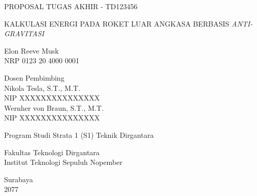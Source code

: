\begin{large}
  PROPOSAL TUGAS AKHIR - TD123456
\end{large}

\vspace{\fill}

\begin{spacing}{1.5}
  \begin{Large}
    KALKULASI ENERGI PADA ROKET LUAR 
    ANGKASA BERBASIS \emph{ANTI-GRAVITASI}
  \end{Large}
\end{spacing}

\vspace{\fill}

\begin{large}
  Elon Reeve Musk \\
  \textmd{NRP 0123 20 4000 0001}
\end{large}

\vspace{\fill}

\begin{large}
  \textmd{Dosen Pembimbing} \\
  Nikola Tesla, S.T., M.T. \\
  \textmd{NIP XXXXXXXXXXXXXXX} \\
  Wernher von Braun, S.T., M.T. \\
  \textmd{NIP XXXXXXXXXXXXXXX}
\end{large}

\vspace{\fill}

Program Studi Strata 1 (S1) Teknik Dirgantara \\

\mdseries

Fakultas Teknologi Dirgantara \\
Institut Teknologi Sepuluh Nopember

Surabaya \\
2077
